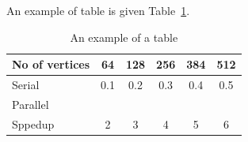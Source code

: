 An example of table is given Table~\ref{tab:example}.
\begin{table}[htb]
	\centering
	\caption{An example of a table}\label{tab:example}
	\begin{tabular}{l|ccccc}
		\toprule
		No of vertices & 64 & 128 & 256 & 384 & 512\\
		\midrule
		Serial &0.1&0.2&0.3&0.4&0.5\\
		Parallel &&&&\\
		Sppedup &2&3&4&5&6\\
		\bottomrule
	\end{tabular}
\end{table} 

 


